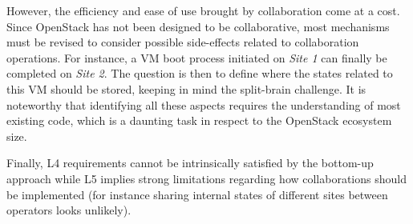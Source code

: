 However, the efficiency and ease of use brought by collaboration come at a
cost. Since OpenStack has not been designed to be collaborative, most
mechanisms must be revised to consider possible side-effects related to
collaboration operations.
%
For instance, a VM boot process initiated on \emph{Site 1} can finally be
completed on \emph{Site 2}. The question is then to define where the states
related to this VM should be stored, keeping in mind the split-brain
challenge.
%
It is noteworthy that identifying all these aspects requires the understanding of most
existing code, which is a daunting task in respect to the OpenStack
ecosystem size.
% 

Finally, L4 requirements cannot be intrinsically satisfied by the
bottom-up approach while L5 implies strong limitations regarding how
collaborations should be implemented (for instance sharing internal
states of different \edge sites between operators looks unlikely).

%



